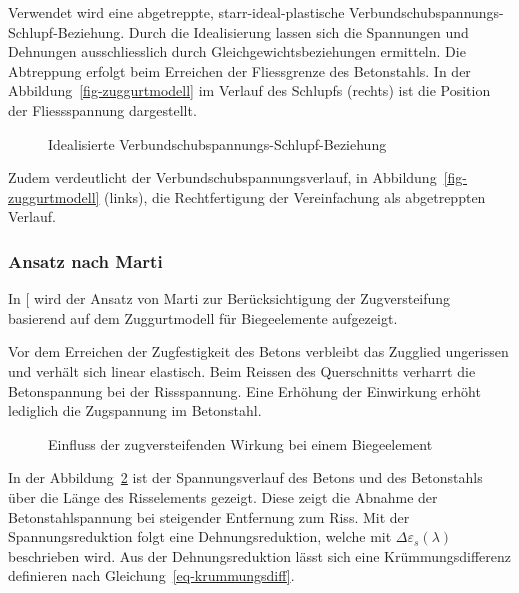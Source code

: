 \documentclass[
  12pt,
  letterpaper,
  egregdoesnotlikesansseriftitles]{scrreprt}
\begin{document}
Verwendet wird eine abgetreppte, starr-ideal-plastische
Verbundschubspannungs-Schlupf-Beziehung. Durch die Idealisierung lassen
sich die Spannungen und Dehnungen ausschliesslich durch
Gleichgewichtsbeziehungen ermitteln. Die Abtreppung erfolgt beim
Erreichen der Fliessgrenze des Betonstahls. In der
Abbildung~\ref{fig-zuggurtmodell} im Verlauf des Schlupfs (rechts) ist
die Position der Fliessspannung dargestellt.

\begin{figure}[H]


\caption{\label{fig-verbund_schlupf}Idealisierte
Verbundschubspannungs-Schlupf-Beziehung}

\end{figure}%

Zudem verdeutlicht der Verbundschubspannungsverlauf, in
Abbildung~\ref{fig-zuggurtmodell} (links), die Rechtfertigung der
Vereinfachung als abgetreppten Verlauf.

\subsubsection{Ansatz nach Marti}\label{ansatz-nach-marti}

In {[}\citeproc{ref-Spathelf2022}{4}{]} wird der Ansatz von Marti zur
Berücksichtigung der Zugversteifung basierend auf dem Zuggurtmodell für
Biegeelemente aufgezeigt.

Vor dem Erreichen der Zugfestigkeit des Betons verbleibt das Zugglied
ungerissen und verhält sich linear elastisch. Beim Reissen des
Querschnitts verharrt die Betonspannung bei der Rissspannung. Eine
Erhöhung der Einwirkung erhöht lediglich die Zugspannung im Betonstahl.

\begin{figure}[H]


\caption{\label{fig-einfluss_zugversteifung}Einfluss der
zugversteifenden Wirkung bei einem Biegeelement}

\end{figure}%

In der Abbildung~\ref{fig-einfluss_zugversteifung} ist der
Spannungsverlauf des Betons und des Betonstahls über die Länge des
Risselements gezeigt. Diese zeigt die Abnahme der Betonstahlspannung bei
steigender Entfernung zum Riss. Mit der Spannungsreduktion folgt eine
Dehnungsreduktion, welche mit \(\Delta \varepsilon_s (\lambda)\)
beschrieben wird. Aus der Dehnungsreduktion lässt sich eine
Krümmungsdifferenz definieren nach Gleichung~\ref{eq-krummungsdiff}.
\end{document}
